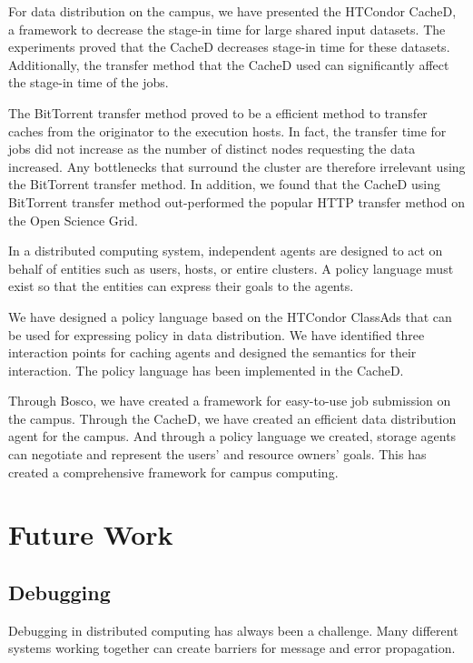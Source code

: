 For data distribution on the campus, we have presented the HTCondor CacheD, a framework to decrease the stage-in time for large shared input datasets.  The experiments proved that the CacheD decreases stage-in time for these datasets.  Additionally, the transfer method that the CacheD used can significantly affect the stage-in time of the jobs.

The BitTorrent transfer method proved to be a efficient method to transfer caches from the originator to the execution hosts.  In fact, the transfer time for jobs did not increase as the number of distinct nodes requesting the data increased.  Any bottlenecks that surround the cluster are therefore irrelevant using the BitTorrent transfer method.  In addition, we found that the CacheD using BitTorrent transfer method out-performed the popular HTTP transfer method on the Open Science Grid.

In a distributed computing system, independent agents are designed to act on behalf of entities such as users, hosts, or entire clusters.  A policy language must exist so that the entities can express their goals to the agents.  

We have designed a policy language based on the HTCondor ClassAds that can be used for expressing policy in data distribution.  We have identified three interaction points for caching agents and designed the semantics for their interaction.  The policy language has been implemented in the CacheD.

Through Bosco, we have created a framework for easy-to-use job submission on the campus.  Through the CacheD, we have created an efficient data distribution agent for the campus.  And through a policy language we created, storage agents can negotiate and represent the users' and resource owners' goals.  This has created a comprehensive framework for campus computing.

\section{Future Work}

\subsection{Debugging}
Debugging in distributed computing has always been a challenge.  Many different systems working together can create barriers for message and error propagation.

